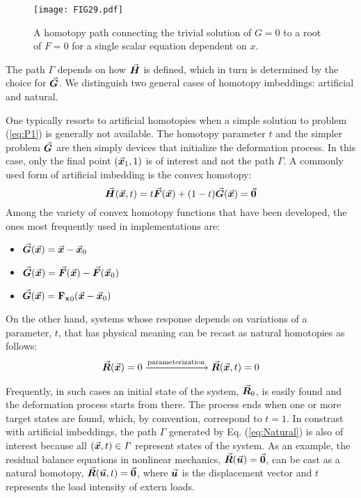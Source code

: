 \begin{figure}[t]
	\centering
	\texttt{[image: FIG29.pdf]}
	\caption{A homotopy path connecting the trivial solution of $G=0$ 
		to a root of $F=0$ for a single scalar equation dependent on $x$.}
	\label{fig:FIG29}
\end{figure}
The path $\mathit{\Gamma}$ depends on how $\vec{\bm{H}}$ is defined, which in turn 
is determined by the choice for $\vec{\bm{G}}$. We distinguish two general
cases of homotopy imbeddings: artificial and natural.

One typically resorts to artificial homotopies when a simple solution to problem
(\ref{eq:P1}) is generally not available. The homotopy parameter
$t$ and the simpler problem $\vec{\bm{G}}$ are then simply devices that
initialize the deformation process. In this
case, only the final point $(\vec{\bm{x}}_1,1)$ is of interest and not the path
$\mathit{\Gamma}$. A commonly used form
of artificial imbedding is the convex homotopy: 
\begin{equation}
	\vec{\bm{H}}(\vec{\bm{x}},t) = t\vec{\bm{F}}(\vec{\bm{x}})+(1-t)\vec{\bm{G}}(\vec{\bm{x}})=\vec{\bm{0}}
	\label{eq:homotopy1}
\end{equation}
Among the variety of convex homotopy functions that have been
developed, the ones most frequently used in implementations are:
\begin{itemize}
	\item{
		$\vec{\bm{G}}(\vec{\bm{x}})=\vec{\bm{x}}-\vec{\bm{x}}_0$}
	\cite{Chow:1978,Watson:2002}
	\item{ $\vec{\bm{G}}(\vec{\bm{x}}) =
		\vec{\bm{F}}(\vec{\bm{x}})-\vec{\bm{F}}(\vec{\bm{x}}_0)$}
	\cite{Keller:1978,Smale:1976}
	\item{ $\vec{\bm{G}}(\vec{\bm{x}}) =
		\mathbf{F_x}_0(\vec{\bm{x}}-\vec{\bm{x}}_0)$}\ \cite{Garcia:1980,Wayburn:1987}
\end{itemize}
On the other hand, systems whose response depends on
variations of a parameter, $t$, that has physical meaning can be recast as 
natural homotopies as follows:
\begin{gather}
	\vec{\bm{R}}(\vec{\bm{x}})=0 \xrightarrow{\text{parameterization}} 
	\vec{\bm{R}}(\vec{\bm{x}},t)=0
	\label{eq:Natural}
\end{gather}

Frequently, in such cases an initial state of the system, $\vec{\bm{R}}_0$, is
easily found and the deformation process starts from there. The
process ends when one or more target states are found, which, by convention, 
correspond to $t=1$. In constrast with artificial imbeddings, the path
$\mathit{\Gamma}$ generated by Eq. (\ref{eq:Natural}) is also of interest
because all $(\vec{\bm{x}},t)\in\mathit{\Gamma}$ represent states of the
system. As an example, the residual balance equations in nonlinear mechanics, 
$\vec{\bm{R}}(\vec{\bm{u}})=\vec{\bm{0}}$, can be cast as a natural homotopy,
$\vec{\bm{R}}(\vec{\bm{u}},t)=\vec{\bm{0}}$, where $\vec{\bm{u}}$ is the displacement vector 
and $t$ represents the load intensity of extern loads.

